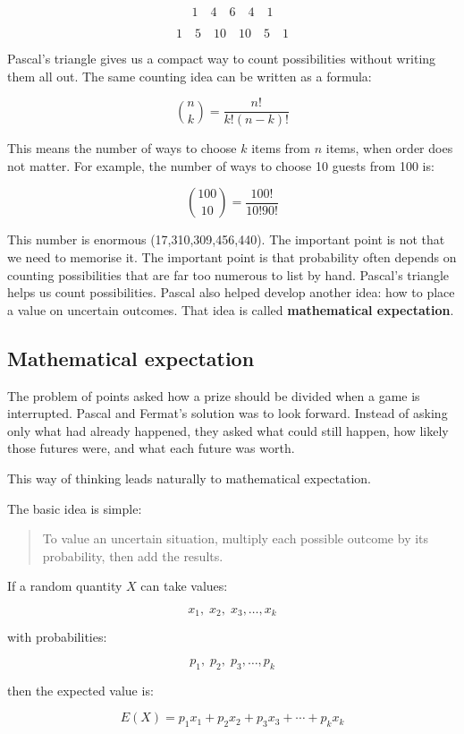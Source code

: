 \documentclass[
  letterpaper,
  DIV=11,
  numbers=noendperiod]{scrreprt}
\begin{document}
\[
1 \quad 4 \quad 6 \quad 4 \quad 1
\]

\[
1 \quad 5 \quad 10 \quad 10 \quad 5 \quad 1
\]

Pascal's triangle gives us a compact way to count possibilities without
writing them all out. The same counting idea can be written as a
formula:

\[
\binom{n}{k}
=
\frac{n!}{k!(n-k)!}
\]

This means the number of ways to choose \(k\) items from \(n\) items,
when order does not matter. For example, the number of ways to choose 10
guests from 100 is:

\[
\binom{100}{10}
=
\frac{100!}{10!90!}
\]

This number is enormous (17,310,309,456,440). The important point is not
that we need to memorise it. The important point is that probability
often depends on counting possibilities that are far too numerous to
list by hand. Pascal's triangle helps us count possibilities. Pascal
also helped develop another idea: how to place a value on uncertain
outcomes. That idea is called \textbf{mathematical expectation}.

\subsection{Mathematical expectation}\label{mathematical-expectation}

The problem of points asked how a prize should be divided when a game is
interrupted. Pascal and Fermat's solution was to look forward. Instead
of asking only what had already happened, they asked what could still
happen, how likely those futures were, and what each future was worth.

This way of thinking leads naturally to mathematical expectation.

The basic idea is simple:

\begin{quote}
To value an uncertain situation, multiply each possible outcome by its
probability, then add the results.
\end{quote}

If a random quantity \(X\) can take values:

\[
x_1,\;x_2,\;x_3,\ldots,x_k
\]

with probabilities:

\[
p_1,\;p_2,\;p_3,\ldots,p_k
\]

then the expected value is:

\[
E(X)
=
p_1x_1+p_2x_2+p_3x_3+\cdots+p_kx_k
\]
\end{document}
